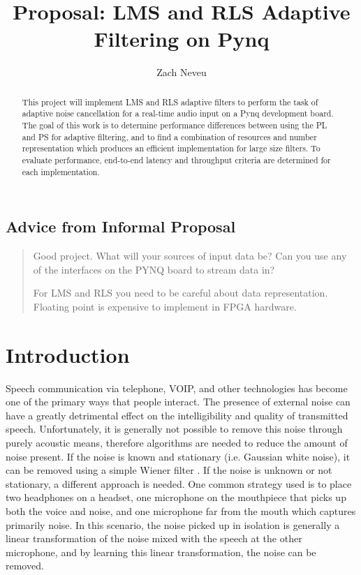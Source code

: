 \documentclass[12pt, letter, twocolumn]{article}
\author{Zach Neveu}
\title{ Proposal: LMS and RLS Adaptive Filtering on Pynq}
\begin{document}
\maketitle

\begin{abstract}
\noindent This project will implement \ac{LMS} and \ac{RLS} adaptive filters to perform the task of adaptive noise cancellation for a real-time audio input on a Pynq development board. The goal of this work is to determine performance differences between using the \ac{PL} and \ac{PS} for adaptive filtering, and to find a combination of resources and number representation which produces an efficient implementation for large size filters. To evaluate performance, end-to-end latency and throughput criteria are determined for each implementation.
\end{abstract}

\subsection*{Advice from Informal Proposal}
\begin{quote}
Good project.  What will your sources of input data be?  Can you use any of the interfaces on the PYNQ board to stream data in?

For \ac{LMS} and \ac{RLS} you need to be careful about data representation.  Floating point is expensive to implement in FPGA hardware.
\end{quote}

\section*{Introduction}%
\label{sec:system}
Speech communication via telephone, VOIP, and other technologies has become one of the primary ways that people interact. The presence of external noise can have a greatly detrimental effect on the intelligibility and quality of transmitted speech. Unfortunately, it is generally not possible to remove this noise through purely acoustic means, therefore algorithms are needed to reduce the amount of noise present. If the noise is known and stationary (i.e. Gaussian white noise), it can be removed using a simple Wiener filter \cite{wiener_extrapolation_1964}. If the noise is unknown or not stationary, a different approach is needed. One common strategy used is to place two headphones on a headset, one microphone on the mouthpiece that picks up both the voice and noise, and one microphone far from the mouth which captures primarily noise. In this scenario, the noise picked up in isolation is generally a linear transformation of the noise mixed with the speech at the other microphone, and by learning this linear transformation, the noise can be removed. 
\end{document}
